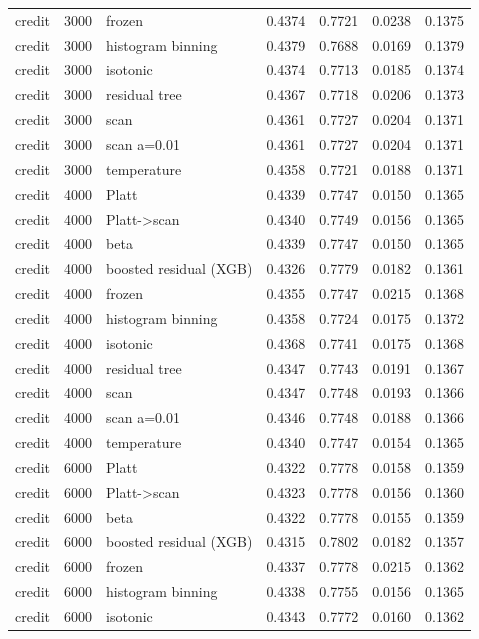 \begin{tabular}{lllrrrr}
credit & 3000 & frozen & 0.4374 & 0.7721 & 0.0238 & 0.1375 \\
credit & 3000 & histogram binning & 0.4379 & 0.7688 & 0.0169 & 0.1379 \\
credit & 3000 & isotonic & 0.4374 & 0.7713 & 0.0185 & 0.1374 \\
credit & 3000 & residual tree & 0.4367 & 0.7718 & 0.0206 & 0.1373 \\
credit & 3000 & scan & 0.4361 & 0.7727 & 0.0204 & 0.1371 \\
credit & 3000 & scan a=0.01 & 0.4361 & 0.7727 & 0.0204 & 0.1371 \\
credit & 3000 & temperature & 0.4358 & 0.7721 & 0.0188 & 0.1371 \\
credit & 4000 & Platt & 0.4339 & 0.7747 & 0.0150 & 0.1365 \\
credit & 4000 & Platt->scan & 0.4340 & 0.7749 & 0.0156 & 0.1365 \\
credit & 4000 & beta & 0.4339 & 0.7747 & 0.0150 & 0.1365 \\
credit & 4000 & boosted residual (XGB) & 0.4326 & 0.7779 & 0.0182 & 0.1361 \\
credit & 4000 & frozen & 0.4355 & 0.7747 & 0.0215 & 0.1368 \\
credit & 4000 & histogram binning & 0.4358 & 0.7724 & 0.0175 & 0.1372 \\
credit & 4000 & isotonic & 0.4368 & 0.7741 & 0.0175 & 0.1368 \\
credit & 4000 & residual tree & 0.4347 & 0.7743 & 0.0191 & 0.1367 \\
credit & 4000 & scan & 0.4347 & 0.7748 & 0.0193 & 0.1366 \\
credit & 4000 & scan a=0.01 & 0.4346 & 0.7748 & 0.0188 & 0.1366 \\
credit & 4000 & temperature & 0.4340 & 0.7747 & 0.0154 & 0.1365 \\
credit & 6000 & Platt & 0.4322 & 0.7778 & 0.0158 & 0.1359 \\
credit & 6000 & Platt->scan & 0.4323 & 0.7778 & 0.0156 & 0.1360 \\
credit & 6000 & beta & 0.4322 & 0.7778 & 0.0155 & 0.1359 \\
credit & 6000 & boosted residual (XGB) & 0.4315 & 0.7802 & 0.0182 & 0.1357 \\
credit & 6000 & frozen & 0.4337 & 0.7778 & 0.0215 & 0.1362 \\
credit & 6000 & histogram binning & 0.4338 & 0.7755 & 0.0156 & 0.1365 \\
credit & 6000 & isotonic & 0.4343 & 0.7772 & 0.0160 & 0.1362 \\

\end{tabular}
